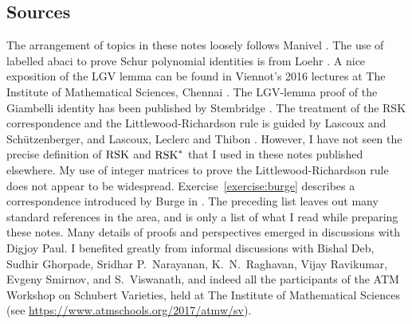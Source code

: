 \documentclass[11pt]{amsproc}
\theoremstyle{definition}
\theoremstyle{example}
\newcommand{\rsk}{\textup{RSK}}
\begin{document}
\subsection{Sources}
\label{sec:notes-literature}
The arrangement of topics in these notes loosely follows Manivel \cite{manivel}. The use of labelled abaci to prove Schur polynomial identities is from Loehr \cite{loehr}. A nice exposition of the LGV lemma can be found in Viennot's 2016 lectures at The Institute of Mathematical Sciences, Chennai \cite{imsc2016}. The LGV-lemma proof of the Giambelli identity has been published by Stembridge \cite{stembridge}. The treatment of the RSK correspondence and the Littlewood-Richardson rule is guided by Lascoux and Sch\"utzenberger\cite{ls}, and Lascoux, Leclerc and Thibon \cite{llt}. However, I have not seen the precise definition of $\rsk$ and $\rsk^*$ that I used in these notes published elsewhere. My use of integer matrices to prove the Littlewood-Richardson rule does not appear to be widespread. Exercise~\ref{exercise:burge} describes a correspondence introduced by Burge in \cite{burge}. The preceding list leaves out many standard references in the area, and is only a list of what I read while preparing these notes.
Many details of proofs and perspectives emerged in discussions with Digjoy Paul.
I benefited greatly from informal discussions with Bishal Deb, Sudhir Ghorpade, Sridhar P.~Narayanan, K.~N.~Raghavan, Vijay Ravikumar, Evgeny Smirnov, and  S.~Viswanath, and indeed all the participants of the ATM Workshop on Schubert Varieties, held at The Institute of Mathematical Sciences (see \url{https://www.atmschools.org/2017/atmw/sv}).


\end{document}
